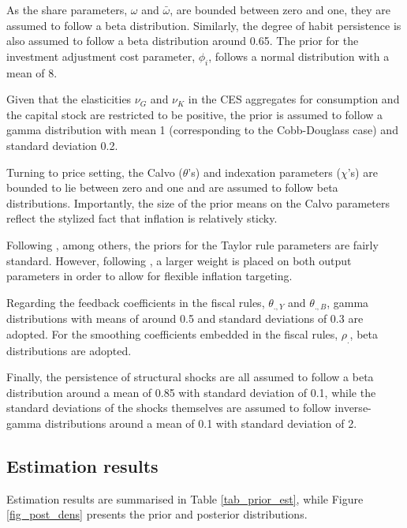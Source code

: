 \documentclass[a4paper,11pt]{article}
\numberwithin{equation}{section}
\begin{document}
	As the share parameters, $\omega$ and $\bar{\omega}$, are bounded between zero and one, they are assumed to follow a beta distribution. Similarly, the degree of habit persistence is also assumed to follow a beta distribution around 0.65. The prior for the investment adjustment cost parameter, $\phi_i$, follows a normal distribution with a mean of 8. 
	
	Given that the elasticities $\nu_G$ and $\nu_K$ in the CES aggregates for consumption and the capital stock are restricted to be positive, the prior is assumed to follow a gamma distribution with mean 1 (corresponding to the Cobb-Douglass case) and	standard deviation 0.2.
	
	Turning to price setting, the Calvo ($\theta$'s) and indexation parameters ($\chi$'s) are bounded to lie between zero and one and are assumed to follow beta distributions. Importantly, the size of the prior means on the Calvo parameters reflect the stylized fact that inflation is relatively sticky.
	
	Following \cite{smets2003}, among others, the priors for the Taylor rule parameters are fairly standard. However, following \cite{steinbach2014}, a larger weight is placed on both output parameters in order to allow for flexible inflation targeting.
	
	Regarding the feedback coefficients in the fiscal rules, $\theta_{.,Y}$ and  $\theta_{.,B}$, gamma distributions with means of around 0.5 and standard deviations of 0.3 are adopted. For the smoothing coefficients embedded in the fiscal rules, $\rho_{.}$, beta distributions are adopted. 
	
	Finally, the persistence of structural shocks are all assumed to follow a beta distribution	around a mean of 0.85 with standard deviation of 0.1, while the standard deviations of the shocks themselves are assumed to follow inverse-gamma distributions around a mean of 0.1 with standard deviation of 2.
	
	\subsection{Estimation results}
	
	Estimation results are summarised in Table \ref{tab_prior_est}, while Figure \ref{fig_post_dens} presents the prior and posterior distributions. 
	
\end{document}
